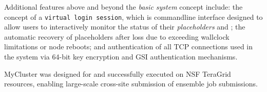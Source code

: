 \documentclass{sig-alternate}
\begin{document}
Additional features above and beyond the \textit{basic \pilotjob system}
concept include: the concept of a \texttt{virtual login session}, which
is commandline interface designed to allow users to interactively
monitor the status of their \textit{placeholders} and \textit{\cus};
the automatic recovery of placeholders after loss due to exceeding wallclock
limitations or node reboots; and authentication of all TCP
connections used in the system via 64-bit key encryption and
GSI authentication mechanisms.

MyCluster was designed for and successfully executed on NSF TeraGrid
resources, enabling large-scale cross-site submission of ensemble
job submissions.
 



%
\end{document}
